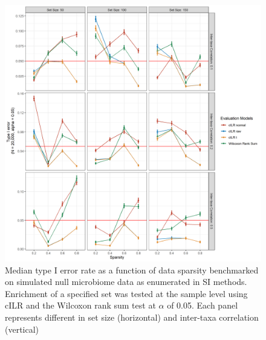 \documentclass{article}
\begin{document}
\begin{figure}[H]
    \centering
    \includegraphics[scale = 0.5]{figures/fdr_single_sample.png}
    \caption{Median type I error rate as a function of data sparsity benchmarked on simulated null microbiome data as enumerated in SI methods. Enrichment of a specified set was tested at the sample level using cILR and the Wilcoxon rank sum test at $\alpha$ of 0.05. Each panel represents different in set size (horizontal) and inter-taxa correlation (vertical)}
\end{figure}
\end{document}
